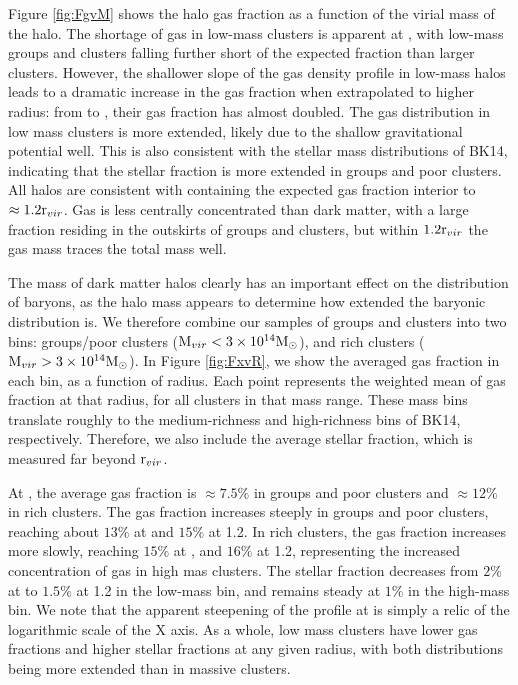 Figure \ref{fig:FgvM} shows the halo gas fraction as a function of the
virial mass of the halo. The shortage of gas in low-mass clusters is
apparent at \rfive{}, with low-mass groups and clusters falling
further short of the expected fraction than larger clusters. However,
the shallower slope of the gas density profile in low-mass halos leads
to a dramatic increase in the gas fraction when extrapolated to higher
radius: from \rfive{} to \rvir{}, their gas fraction has almost
doubled. The gas distribution in low mass clusters is more extended,
likely due to the shallow gravitational potential well. This is also
consistent with the stellar mass distributions of BK14, indicating
that the stellar fraction is more extended in groups and poor
clusters. All halos are consistent with containing the expected gas
fraction interior to $\approx1.2\textrm{r\ensuremath{_{vir}}}$. Gas is less centrally
concentrated than dark matter, with a large fraction residing in the
outskirts of groups and clusters, but within $1.2\textrm{r\ensuremath{_{vir}}}$ the gas mass
traces the total mass well.



The mass of dark matter halos clearly has an important effect on the
distribution of baryons, as the halo mass appears to determine how
extended the baryonic distribution is. We therefore combine our
samples of groups and clusters into two bins: groups/poor clusters
($\textrm{M\ensuremath{_{vir}}}{}<3\times 10^{14}\textrm{M}_\odot$), and rich clusters
($\textrm{M\ensuremath{_{vir}}}{}>3\times 10^{14}\textrm{M}_\odot$). In Figure \ref{fig:FxvR}, we show the
averaged gas fraction in each bin, as a function of radius. Each point
represents the weighted mean of gas fraction at that radius, for all
clusters in that mass range. These mass bins translate roughly to
the medium-richness and high-richness bins of BK14,
respectively. Therefore, we also include the average stellar fraction,
which is measured far beyond $\textrm{r\ensuremath{_{vir}}}$.



At \rfive{}, the average gas fraction is $\approx7.5\%$ in groups and
poor clusters and $\approx12\%$ in rich clusters. The gas fraction
increases steeply in groups and poor clusters, reaching about $13\%$
at \rvir{} and $15\%$ at 1.2\rvir{}. In rich clusters, the gas
fraction increases more slowly, reaching $15\%$ at \rvir{}, and $16\%$
at 1.2\rvir{}, representing the increased concentration of gas in high
mas clusters. The stellar fraction decreases from $2\%$ at \rfive{} to
$1.5\%$ at 1.2\rvir{} in the low-mass bin, and remains steady at $1\%$
in the high-mass bin. We note that the apparent steepening of the
\fg{} profile at \rvir{} is simply a relic of the logarithmic scale of
the X axis. As a whole, low mass clusters have lower gas fractions and
higher stellar fractions at any given radius, with both distributions
being more extended than in massive clusters.

